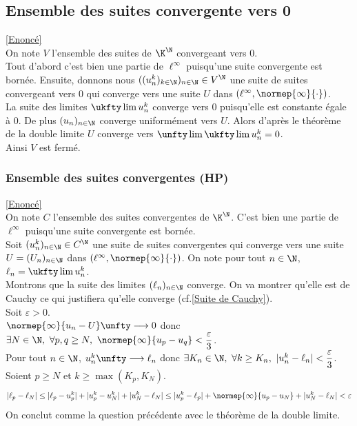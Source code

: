 \documentclass{book}
\begin{document}
	\subsection{Ensemble des suites convergente vers 0 }
	\label{sec:ensemble-des-suites-convergents-vers-0}
	\textcolor{blue}{\hyperref[Ensemble des suites convergents vers 0]{[Enoncé]}}\\
	On note $V$ l'ensemble des suites de $\K^\N$ convergeant vers $0$.\\
	Tout d'abord c'est bien une partie de $\ell^\infty$ puisqu'une suite convergente est bornée. Ensuite, donnons nous $((u_n^k)_{k\in \N})_{n\in \N}\in V^\N$ une suite de suites convergeant vers $0$ qui converge vers une suite $U$ dans $(\ell^\infty,\normep{\infty}{\cdot})$.\\
	La suite des limites $\ukfty\lim u_n^k$ converge vers $0$ puisqu'elle est constante égale à $0$. De plus $(u_n)_{n\in \N}$ converge uniformément vers $U$. Alors d'après le théorème de la double limite $U$ converge vers $\unfty\lim\ukfty\lim u_n^k=0$.\\
	Ainsi $V$ est fermé.
	
	\subsubsection{Ensemble des suites convergentes  (HP)}
	\label{sec:ensemble-des-suites-convergentes}
	\textcolor{blue}{\hyperref[Ensemble des suites convergentes]{[Enoncé]}}\\
	On note $C$ l'ensemble des suites convergentes de $\K^\N$. C'est bien une partie de $\ell^\infty$ puisqu'une suite convergente est bornée.\\
	Soit $(u_n^k)_{n\in \N}\in C^\N$ une suite de suites convergentes qui converge vers une suite $U=(U_n)_{n\in \N}$ dans $(\ell^\infty,\normep{\infty}{\cdot})$. On note pour tout $n\in \N$, $\ell_n=\ukfty\lim u_n^k$.\\
	Montrons que la suite des limites $(\ell_n)_{n\in \N}$ converge. On va montrer qu'elle est de Cauchy ce qui justifiera qu'elle converge (cf.\ref{Suite de Cauchy}).\\
	Soit $\varepsilon>0$.\\
	$\normep{\infty}{u_n-U}\unfty\longrightarrow0$ donc $\exists N\in \N,\ \forall p,q\geq N,\ \normep{\infty}{u_p-u_q}<\dfrac{\varepsilon}{3}$.\\
	Pour tout $n\in\N$, $u_n^k\unfty\longrightarrow\ell_n$ donc $\exists K_n\in \N,\ \forall k\geq K_n,\ |u_n^k-\ell_n|<\dfrac{\varepsilon}{3}$.\\
	Soient $p\geq N$ et $k\geq \max(K_p,K_N)$.
	$$|\ell_p-\ell_N|\leq |\ell_p-u_p^k|+|u_p^k-u_N^k|+|u_N^k-\ell_N|\leq |u_p^k-\ell_p|+\normep{\infty}{u_p-u_N}+|u_N^k-\ell_N|<\varepsilon$$
	On conclut comme la question précédente avec le théorème de la double limite.
	
\end{document}
